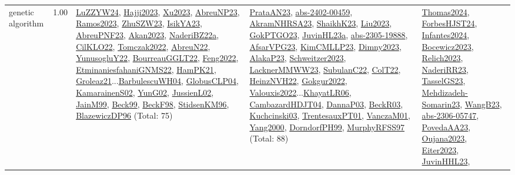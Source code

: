{\begin{longtable}{p{3cm}r>{\raggedright\arraybackslash}p{6cm}>{\raggedright\arraybackslash}p{6cm}>{\raggedright\arraybackslash}p{8cm}}
\index{genetic algorithm}\index{Algorithms!genetic algorithm}genetic algorithm &  1.00 & \hyperref[detail:LuZZYW24]{LuZZYW24}, \hyperref[detail:Hajji2023]{Hajji2023}, \hyperref[detail:Xu2023]{Xu2023}, \hyperref[detail:AbreuNP23]{AbreuNP23}, \hyperref[detail:Ramos2023]{Ramos2023}, \hyperref[detail:ZhuSZW23]{ZhuSZW23}, \hyperref[detail:IsikYA23]{IsikYA23}, \hyperref[detail:AbreuPNF23]{AbreuPNF23}, \hyperref[detail:Akan2023]{Akan2023}, \hyperref[detail:NaderiBZ22a]{NaderiBZ22a}, \hyperref[detail:CilKLO22]{CilKLO22}, \hyperref[detail:Tomczak2022]{Tomczak2022}, \hyperref[detail:AbreuN22]{AbreuN22}, \hyperref[detail:YunusogluY22]{YunusogluY22}, \hyperref[detail:BourreauGGLT22]{BourreauGGLT22}, \hyperref[detail:Feng2022]{Feng2022}, \hyperref[detail:EtminaniesfahaniGNMS22]{EtminaniesfahaniGNMS22}, \hyperref[detail:HamPK21]{HamPK21}, \hyperref[detail:Groleaz21]{Groleaz21}...\hyperref[detail:BarbulescuWH04]{BarbulescuWH04}, \hyperref[detail:GlobusCLP04]{GlobusCLP04}, \hyperref[detail:KamarainenS02]{KamarainenS02}, \hyperref[detail:YunG02]{YunG02}, \hyperref[detail:JussienL02]{JussienL02}, \hyperref[detail:JainM99]{JainM99}, \hyperref[detail:Beck99]{Beck99}, \hyperref[detail:BeckF98]{BeckF98}, \hyperref[detail:StidsenKM96]{StidsenKM96}, \hyperref[detail:BlazewiczDP96]{BlazewiczDP96} (Total: 75) & \hyperref[detail:PrataAN23]{PrataAN23}, \hyperref[detail:abs-2402-00459]{abs-2402-00459}, \hyperref[detail:AkramNHRSA23]{AkramNHRSA23}, \hyperref[detail:ShaikhK23]{ShaikhK23}, \hyperref[detail:Liu2023]{Liu2023}, \hyperref[detail:GokPTGO23]{GokPTGO23}, \hyperref[detail:JuvinHL23a]{JuvinHL23a}, \hyperref[detail:abs-2305-19888]{abs-2305-19888}, \hyperref[detail:AfsarVPG23]{AfsarVPG23}, \hyperref[detail:KimCMLLP23]{KimCMLLP23}, \hyperref[detail:Dimny2023]{Dimny2023}, \hyperref[detail:AlakaP23]{AlakaP23}, \hyperref[detail:Schweitzer2023]{Schweitzer2023}, \hyperref[detail:LacknerMMWW23]{LacknerMMWW23}, \hyperref[detail:SubulanC22]{SubulanC22}, \hyperref[detail:ColT22]{ColT22}, \hyperref[detail:HeinzNVH22]{HeinzNVH22}, \hyperref[detail:Gokgur2022]{Gokgur2022}, \hyperref[detail:Valouxis2022]{Valouxis2022}...\hyperref[detail:KhayatLR06]{KhayatLR06}, \hyperref[detail:CambazardHDJT04]{CambazardHDJT04}, \hyperref[detail:DannaP03]{DannaP03}, \hyperref[detail:BeckR03]{BeckR03}, \hyperref[detail:Kuchcinski03]{Kuchcinski03}, \hyperref[detail:TrentesauxPT01]{TrentesauxPT01}, \hyperref[detail:VanczaM01]{VanczaM01}, \hyperref[detail:Yang2000]{Yang2000}, \hyperref[detail:DorndorfPH99]{DorndorfPH99}, \hyperref[detail:MurphyRFSS97]{MurphyRFSS97} (Total: 88) & \hyperref[detail:Thomas2024]{Thomas2024}, \hyperref[detail:ForbesHJST24]{ForbesHJST24}, \hyperref[detail:Infantes2024]{Infantes2024}, \hyperref[detail:Bocewicz2023]{Bocewicz2023}, \hyperref[detail:Relich2023]{Relich2023}, \hyperref[detail:NaderiRR23]{NaderiRR23}, \hyperref[detail:TasselGS23]{TasselGS23}, \hyperref[detail:Mehdizadeh-Somarin23]{Mehdizadeh-Somarin23}, \hyperref[detail:WangB23]{WangB23}, \hyperref[detail:abs-2306-05747]{abs-2306-05747}, \hyperref[detail:PovedaAA23]{PovedaAA23}, \hyperref[detail:Oujana2023]{Oujana2023}, \hyperref[detail:Eiter2023]{Eiter2023}, \hyperref[detail:JuvinHHL23]{JuvinHHL23}, 
\end{longtable}}
